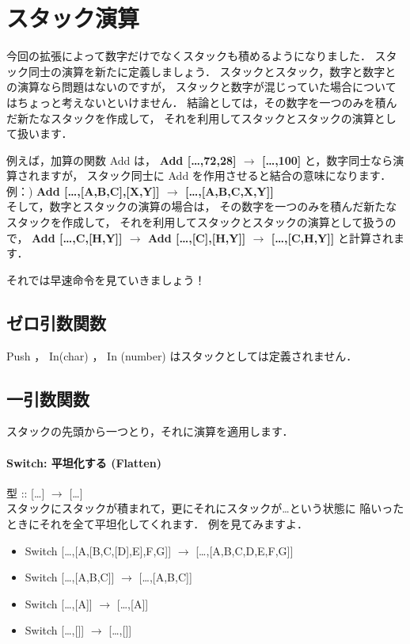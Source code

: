 \section{スタック演算}

今回の拡張によって数字だけでなくスタックも積めるようになりました．
スタック同士の演算を新たに定義しましょう．
スタックとスタック，数字と数字との演算なら問題はないのですが，
スタックと数字が混じっていた場合についてはちょっと考えないといけません．
結論としては，その数字を一つのみを積んだ新たなスタックを作成して，
それを利用してスタックとスタックの演算として扱います．

例えば，加算の関数 Add は， \textbf{Add {[}\ldots{},72,28{]}
$\to$ {[}\ldots{},100{]}} と，数字同士なら演算されますが，
スタック同士に Add を作用させると結合の意味になります．\\例：) \textbf{Add
{[}\ldots{},{[}A,B,C{]},{[}X,Y{]}{]} $\to$
{[}\ldots{},{[}A,B,C,X,Y{]}{]}}\\そして，数字とスタックの演算の場合は，
その数字を一つのみを積んだ新たなスタックを作成して，
それを利用してスタックとスタックの演算として扱うので， \textbf{Add
{[}\ldots{},C,{[}H,Y{]}{]} $\to$ Add
{[}\ldots{},{[}C{]},{[}H,Y{]}{]} $\to$
{[}\ldots{},{[}C,H,Y{]}{]}} と計算されます．

それでは早速命令を見ていきましょう！

\subsection{ゼロ引数関数}

Push ， In(char) ， In (number) はスタックとしては定義されません．

\subsection{一引数関数}

スタックの先頭から一つとり，それに演算を適用します．

\paragraph{Switch: 平坦化する (Flatten)}

型 :: {[}\ldots{}{]} $\to$
{[}\ldots{}{]}\\スタックにスタックが積まれて，更にそれにスタックが\ldots{}という状態に
陥いったときにそれを全て平坦化してくれます． 例を見てみますよ．

\begin{itemize}
\item
  Switch {[}\ldots{},{[}A,{[}B,C,{[}D{]},E{]},F,G{]}{]} $\to$
  {[}\ldots{},{[}A,B,C,D,E,F,G{]}{]}
\item
  Switch {[}\ldots{},{[}A,B,C{]}{]} $\to$
  {[}\ldots{},{[}A,B,C{]}{]}
\item
  Switch {[}\ldots{},{[}A{]}{]} $\to$ {[}\ldots{},{[}A{]}{]}
\item
  Switch {[}\ldots{},{[}{]}{]} $\to$ {[}\ldots{},{[}{]}{]}
\end{itemize}

